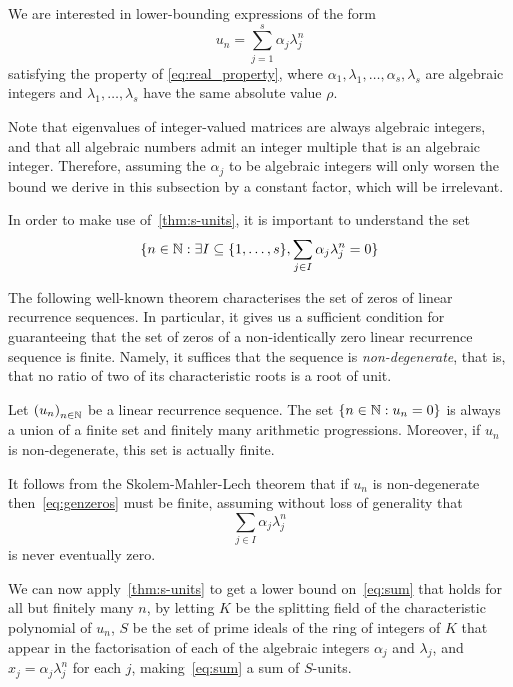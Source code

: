 We are interested in lower-bounding expressions of the form
\begin{equation}
\label{eq:sum}
u_{n}=\sum\limits_{j=1}^{s}\alpha_{j}\lambda_j^{n}
\end{equation}
satisfying the property of \cref{eq:real_property}, where $\alpha_{1}, \lambda_{1}, \ldots, \alpha_{s}, \lambda_{s}$ are algebraic integers and $\lambda_{1},\ldots,\lambda_{s}$ have the same absolute value $\rho$.

Note that eigenvalues of integer-valued matrices are always algebraic integers, and that all algebraic numbers admit an integer multiple that is an algebraic integer. Therefore, assuming the $\alpha_{j}$ to be algebraic integers will only worsen the bound we derive in this subsection by a constant factor, which will be irrelevant.

In order to make use of~\cref{thm:s-units}, it is important to understand the set
\begin{equation}
\lbrace n\in\Naturals: \exists I\subseteq \lbrace 1,\ldots,s\rbrace, \sum\limits_{j\in I}\alpha_j\lambda_j^n=0\rbrace
\label{eq:genzeros}
\end{equation}

The following well-known theorem characterises the set of zeros of linear recurrence sequences. In particular, it gives us a sufficient condition for guaranteeing that the set of zeros of a non-identically zero linear recurrence sequence is finite. Namely, it suffices that the sequence is \emph{non-degenerate}, that is, that no ratio of two of its characteristic roots is a root of unit.

\begin{theorem}
Let ${(u_{n})}_{n \in \mathbb{N}}$ be a linear recurrence sequence. The set $\lbrace n\in\mathbb{N}: u_n=0\rbrace$ is always a union of a finite set and finitely many arithmetic progressions. Moreover, if $u_n$ is non-degenerate, this set is actually finite.
\end{theorem}

It follows from the Skolem-Mahler-Lech theorem that if $u_n$ is non-degenerate  then~\eqref{eq:genzeros} must be finite, assuming without loss of generality that
\begin{equation*}
\sum\limits_{j\in I}\alpha_j\lambda_j^n
\end{equation*}
is never eventually zero.

We can now apply~\cref{thm:s-units} to get a lower bound on~\eqref{eq:sum} that holds for all but finitely many $n$, by letting $K$ be the splitting field of the characteristic polynomial of $u_n$, $S$ be the set of prime ideals of the ring of integers of $K$ that appear in the factorisation of each of the algebraic integers $\alpha_j$ and $\lambda_j$, and $x_j=\alpha_j\lambda_j^n$ for each $j$, making~\eqref{eq:sum} a sum of $S$-units.

